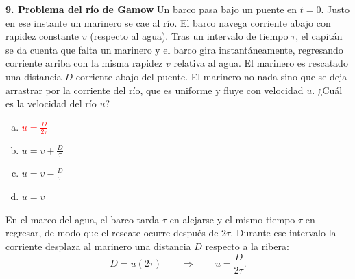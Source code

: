 \textbf{9. Problema del río de Gamow}
Un barco pasa bajo un puente en $t=0$. Justo en ese instante un marinero se cae al río. El barco navega corriente abajo con rapidez constante $v$ (respecto al agua). Tras un intervalo de tiempo $\tau$, el capitán se da cuenta que falta un marinero y el barco gira instantáneamente, regresando corriente arriba con la misma rapidez $v$ relativa al agua. El marinero es rescatado una distancia $D$ corriente abajo del puente. El marinero no nada sino que se deja arrastrar por la corriente del río, que es uniforme y fluye con velocidad $u$. ¿Cuál es la velocidad del río $u$?
\begin{enumerate}[a)]
    \item \textcolor{red}{$u = \frac{D}{2\tau}$}
    \item $u = v + \frac{D}{\tau}$
    \item $u = v - \frac{D}{\tau}$
    \item $u = v$
\end{enumerate}





En el marco del agua, el barco tarda $\tau$ en alejarse y el mismo tiempo $\tau$ en regresar, de modo que el rescate ocurre después de $2\tau$. Durante ese intervalo la corriente desplaza al marinero una distancia $D$ respecto a la ribera:
\[
D=u(2\tau)
\qquad\Longrightarrow\qquad
u=\boxed{\frac{D}{2\tau}}.
\]
